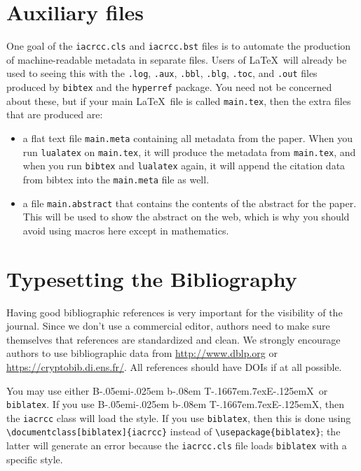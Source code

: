 \documentclass{iacrcc}
\begin{document}
\section{Auxiliary files}
One goal of the \texttt{iacrcc.cls} and \texttt{iacrcc.bst}
  files is to automate the production of machine-readable metadata in
  separate files. Users of \LaTeX\ will already be used to seeing this
  with the \texttt{.log}, \texttt{.aux}, \texttt{.bbl}, \texttt{.blg},
  \texttt{.toc}, and \texttt{.out} files produced by \texttt{bibtex}
  and the \texttt{hyperref} package.  You need not be concerned about
  these, but if your main \LaTeX\ file is called \texttt{main.tex},
  then the extra files that are produced are:
\begin{itemize}
\item a flat text file \texttt{main.meta} containing all metadata
  from the paper.  When you run \texttt{lualatex} on
  \texttt{main.tex}, it will produce the metadata from
  \texttt{main.tex}, and when you run \texttt{bibtex} and
  \texttt{lualatex} again, it will append the citation data from
  bibtex into the \texttt{main.meta} file as well.
\item a file \texttt{main.abstract} that contains
  the contents of the abstract for the paper. This will be used to show
  the abstract on the web, which is why you should avoid using macros here
  except in mathematics.
\end{itemize}

\section{Typesetting the Bibliography}
\label{sec:biblio}

\def\BibTeX{{\rm B\kern-.05em{\sc i\kern-.025em b}\kern-.08em
    T\kern-.1667em\lower.7ex\hbox{E}\kern-.125emX}}

Having good bibliographic references is very important for the
visibility of the journal.  Since we don't use a commercial editor,
authors need to make sure themselves that references are standardized
and clean.  We strongly encourage authors to use bibliographic data
from \url{http://www.dblp.org} or \url{https://cryptobib.di.ens.fr/}.
All references should have DOIs if at all possible.

You may use either \BibTeX\ or \texttt{biblatex}. If you
use \BibTeX, then the \texttt{iacrcc} class will load the
\verb++ style.  If you use
\texttt{biblatex}, then this is done using
\verb+\documentclass[biblatex]{iacrcc}+ instead of
\verb+\usepackage{biblatex}+; the latter will generate an error
because the \texttt{iacrcc.cls} file loads \texttt{biblatex} with a
specific style.
\end{document}
